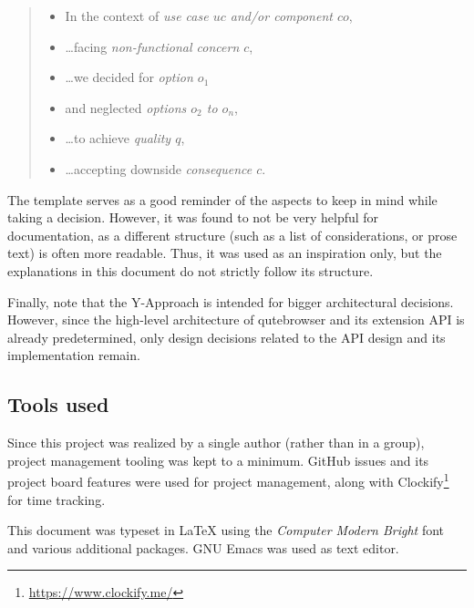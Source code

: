 \begin{quote}
  \begin{itemize}[parsep=5pt]
    \item In the context of \emph{use case $uc$ and/or component $co$},
    \item \ldots facing \emph{non-functional concern $c$},
    \item \ldots we decided for \emph{option $o_1$}
    \item and neglected \emph{options $o_2$ to $o_n$},
    \item \ldots to achieve \emph{quality $q$},
    \item \ldots accepting downside \emph{consequence $c$}.
  \end{itemize}
\end{quote}

The template serves as a good reminder of the aspects to keep in mind
while taking a decision. However, it was found to not be very helpful for
documentation, as a different structure (such as a list of considerations, or
prose text) is often more readable. Thus, it was used as an inspiration only,
but the explanations in this document do not strictly follow its structure.

Finally, note that the Y-Approach is intended for bigger architectural
decisions. However, since the high-level architecture of qutebrowser and its
extension API is already predetermined, only design decisions related to the API
design and its implementation remain.

\subsection{Tools used}
Since this project was realized by a single author (rather than in a group),
project management tooling was kept to a minimum. GitHub issues and its project
board features were used for project management, along with
Clockify\footnote{\url{https://www.clockify.me/}} for time tracking.

This document was typeset in \LaTeX{} using the \emph{Computer Modern Bright}
font and various additional packages. GNU Emacs was used as text editor.